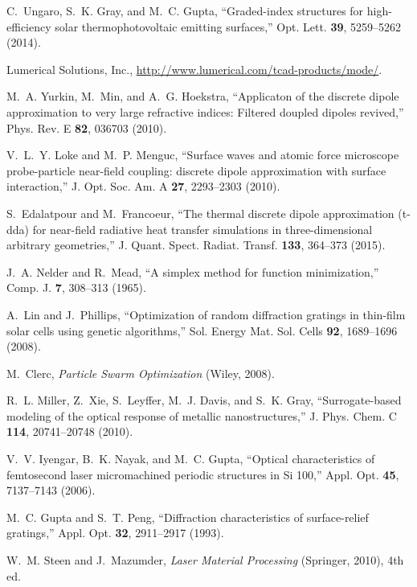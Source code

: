 \documentclass[10pt,letterpaper]{article}
\begin{document}
\begin{thebibliography}{100}
C.~Ungaro, S.~K. Gray, and M.~C. Gupta, \enquote{Graded-index structures for
  high-efficiency solar thermophotovoltaic emitting surfaces,} Opt. Lett.
  \textbf{39}, 5259--5262 (2014).

{Lumerical Solutions, Inc.},
  \url{http://www.lumerical.com/tcad-products/mode/}.

M.~A. Yurkin, M.~Min, and A.~G. Hoekstra, \enquote{Applicaton of the discrete
  dipole approximation to very large refractive indices: Filtered doupled
  dipoles revived,} Phys. Rev. E \textbf{82}, 036703 (2010).

V.~L.~Y. Loke and M.~P. Menguc, \enquote{Surface waves and atomic force
  microscope probe-particle near-field coupling: discrete dipole approximation
  with surface interaction,} J. Opt. Soc. Am. A \textbf{27}, 2293--2303 (2010).

S.~Edalatpour and M.~Francoeur, \enquote{The thermal discrete dipole
  approximation (t-dda) for near-field radiative heat transfer simulations in
  three-dimensional arbitrary geometries,} J. Quant. Spect. Radiat. Transf.
  \textbf{133}, 364--373 (2015).

J.~A. Nelder and R.~Mead, \enquote{A simplex method for function minimization,}
  Comp. J. \textbf{7}, 308--313 (1965).

A.~Lin and J.~Phillips, \enquote{Optimization of random diffraction gratings in
  thin-film solar cells using genetic algorithms,} Sol. Energy Mat. Sol. Cells
  \textbf{92}, 1689--1696 (2008).

M.~Clerc, \emph{Particle Swarm Optimization} (Wiley, 2008).

R.~L. Miller, Z.~Xie, S.~Leyffer, M.~J. Davis, and S.~K. Gray,
  \enquote{Surrogate-based modeling of the optical response of metallic
  nanostructures,} J. Phys. Chem. C \textbf{114}, 20741--20748 (2010).

V.~V. Iyengar, B.~K. Nayak, and M.~C. Gupta, \enquote{Optical characteristics
  of femtosecond laser micromachined periodic structures in {S}i 100,} Appl.
  Opt. \textbf{45}, 7137--7143 (2006).

M.~C. Gupta and S.~T. Peng, \enquote{Diffraction characteristics of
  surface-relief gratings,} Appl. Opt. \textbf{32}, 2911--2917 (1993).

W.~M. Steen and J.~Mazumder, \emph{Laser Material Processing} (Springer, 2010),
  4th ed.


\end{thebibliography}
\end{document}
